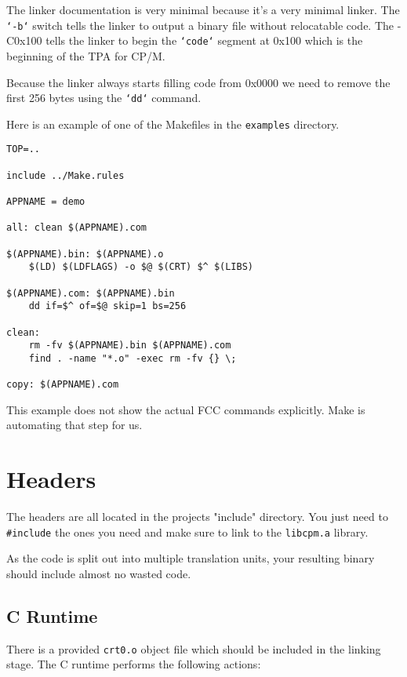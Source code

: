 \documentclass[10pt,a4paper,hidelinks]{article}
\begin{document}
The linker documentation is very minimal because it's a very minimal linker.
The \texttt{`-b`} switch tells the linker to output a binary file without
relocatable code.  The -C0x100 tells the linker to begin the \texttt{`code`}
segment at 0x100 which is the beginning of the TPA for CP/M.

Because the linker always starts filling code from 0x0000 we need to remove the
first 256 bytes using the \texttt{`dd`} command.
\pagebreak

Here is an example of one of the Makefiles in the \texttt{examples} directory.

\begin{center}
  \begin{lstlisting}[caption=Example Makefile]
TOP=..

include ../Make.rules

APPNAME = demo

all: clean $(APPNAME).com

$(APPNAME).bin: $(APPNAME).o
	$(LD) $(LDFLAGS) -o $@ $(CRT) $^ $(LIBS)

$(APPNAME).com: $(APPNAME).bin
	dd if=$^ of=$@ skip=1 bs=256

clean:
	rm -fv $(APPNAME).bin $(APPNAME).com
	find . -name "*.o" -exec rm -fv {} \;

copy: $(APPNAME).com
  \end{lstlisting}
\end{center}
\label{lst:makefile}

This example does not show the actual FCC commands explicitly.  Make is
automating that step for us.

\pagebreak

\section{Headers}

The headers are all located in the projects "include" directory.  You just need
to \texttt{\#include} the ones you need and make sure to link to the
\texttt{libcpm.a} library.

As the code is split out into multiple translation units, your resulting binary
should include almost no wasted code.


\subsection{C Runtime}

There is a provided \texttt{crt0.o} object file which should be included in the
linking stage.  The C runtime performs the following actions:
\end{document}
